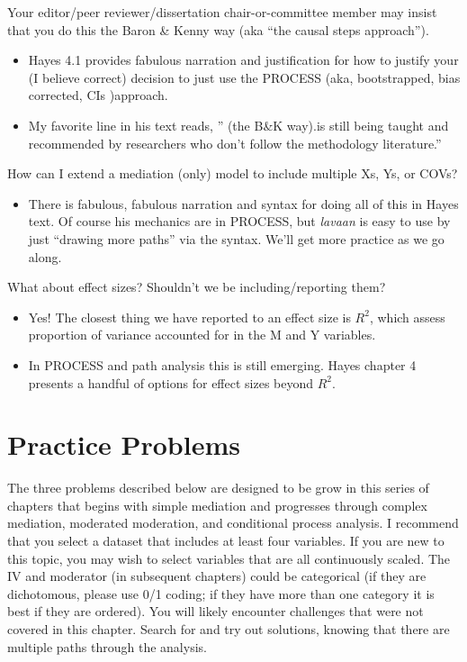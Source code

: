 \documentclass[
  11pt,
]{book}
\providecommand{\tightlist}{%
  \setlength{\itemsep}{0pt}\setlength{\parskip}{0pt}}
\begin{document}
Your editor/peer reviewer/dissertation chair-or-committee member may insist that you do this the Baron \& Kenny way (aka ``the causal steps approach'').

\begin{itemize}
\tightlist
\item
  Hayes 4.1 \citeyearpar{hayes_introduction_2018} provides fabulous narration and justification for how to justify your (I believe correct) decision to just use the PROCESS (aka, bootstrapped, bias corrected, CIs )approach.
\item
  My favorite line in his text reads, '' (the B\&K way).is still being taught and recommended by researchers who don't follow the methodology literature.''
\end{itemize}

How can I extend a mediation (only) model to include multiple Xs, Ys, or COVs?

\begin{itemize}
\tightlist
\item
  There is fabulous, fabulous narration and syntax for doing all of this in Hayes text. Of course his mechanics are in PROCESS, but \emph{lavaan} is easy to use by just ``drawing more paths'' via the syntax. We'll get more practice as we go along.
\end{itemize}

What about effect sizes? Shouldn't we be including/reporting them?

\begin{itemize}
\tightlist
\item
  Yes! The closest thing we have reported to an effect size is \(R^2\), which assess proportion of variance accounted for in the M and Y variables.\\
\item
  In PROCESS and path analysis this is still emerging. Hayes chapter 4 presents a handful of options for effect sizes beyond \(R^2\).
\end{itemize}

\hypertarget{practice-problems-5}{%
\section{Practice Problems}\label{practice-problems-5}}

The three problems described below are designed to be grow in this series of chapters that begins with simple mediation and progresses through complex mediation, moderated moderation, and conditional process analysis. I recommend that you select a dataset that includes at least four variables. If you are new to this topic, you may wish to select variables that are all continuously scaled. The IV and moderator (in subsequent chapters) could be categorical (if they are dichotomous, please use 0/1 coding; if they have more than one category it is best if they are ordered). You will likely encounter challenges that were not covered in this chapter. Search for and try out solutions, knowing that there are multiple paths through the analysis.
\end{document}

